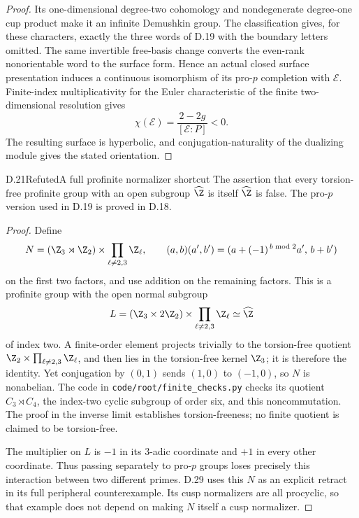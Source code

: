 \begin{proof}
Its one-dimensional degree-two cohomology and nondegenerate degree-one cup product make it an infinite Demushkin group. The classification \cite[Theorem 1.9]{R-Wilkes} gives, for these characters, exactly the three words of D.19 with the boundary letters omitted. The same invertible free-basis change converts the even-rank nonorientable word to the surface form. Hence an actual closed surface presentation induces a continuous isomorphism of its pro-$p$ completion with $\mathcal E$. Finite-index multiplicativity for the Euler characteristic of the finite two-dimensional resolution gives
\[
 \chi(\mathcal E)=\frac{2-2g}{[\mathcal E:P]}<0.
\]
The resulting surface is hyperbolic, and conjugation-naturality of the dualizing module gives the stated orientation.
\end{proof}

\begin{claim}{D.21}{Refuted}{A full profinite normalizer shortcut}
The assertion that every torsion-free profinite group with an open subgroup $\widehat\Z$ is itself $\widehat\Z$ is false. The pro-$p$ version used in D.19 is proved in D.18.
\end{claim}
\begin{proof}
Define
\[
 N=(\Z_3\rtimes\Z_2)\times\prod_{\ell\ne2,3}\Z_\ell,
 \qquad (a,b)(a',b')=(a+(-1)^{\,b\bmod2}a',\,b+b')
\]
on the first two factors, and use addition on the remaining factors.
This is a profinite group with the open normal subgroup
\[
 L=(\Z_3\times2\Z_2)\times\prod_{\ell\ne2,3}\Z_\ell
       \simeq\widehat\Z
\]
of index two. A finite-order element projects trivially to the torsion-free quotient
$\Z_2\times\prod_{\ell\ne2,3}\Z_\ell$, and then lies in the torsion-free kernel $\Z_3$; it is therefore the identity. Yet conjugation by $(0,1)$ sends $(1,0)$ to $(-1,0)$, so $N$ is nonabelian. The code in \texttt{code/root/finite\_checks.py} checks its quotient
$C_3\rtimes C_4$, the index-two cyclic subgroup of order six, and this noncommutation. The proof in the inverse limit establishes torsion-freeness; no finite quotient is claimed to be torsion-free.

The multiplier on $L$ is $-1$ in its $3$-adic coordinate and $+1$ in every other coordinate. Thus passing separately to pro-$p$ groups loses precisely this interaction between two different primes. D.29 uses this $N$ as an explicit retract in its full peripheral counterexample. Its cusp normalizers are all procyclic, so that example does not depend on making $N$ itself a cusp normalizer.
\end{proof}

